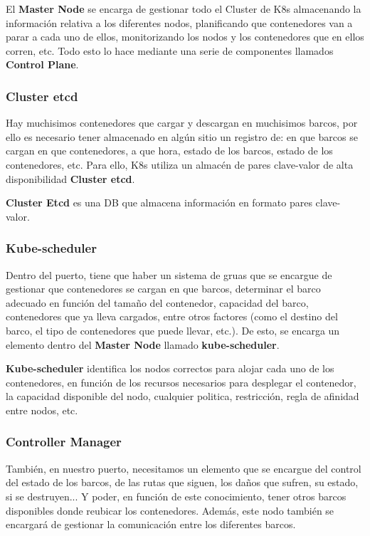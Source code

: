 \documentclass{article}
\begin{document}
El \textbf{Master Node} se encarga de gestionar todo el Cluster de K8s almacenando la información relativa a los diferentes nodos, planificando que contenedores van a parar a cada uno de ellos, monitorizando los nodos y los contenedores que en ellos corren, etc. Todo esto lo hace mediante una serie de componentes llamados \textbf{Control Plane}.

\subsubsection{Cluster etcd}

Hay muchisimos contenedores que cargar y descargan en muchisimos barcos, por ello es necesario tener almacenado en algún sitio un registro de: en que barcos se cargan en que contenedores, a que hora, estado de los barcos, estado de los contenedores, etc. Para ello, K8s utiliza un almacén de pares clave-valor de alta disponibilidad \textbf{Cluster etcd}.

\textbf{Cluster Etcd} es una DB que almacena información en formato pares clave-valor.

\subsubsection{Kube-scheduler}

Dentro del puerto, tiene que haber un sistema de gruas que se encargue de gestionar que contenedores se cargan en que barcos, determinar el barco adecuado en función del tamaño del contenedor, capacidad del barco, contenedores que ya lleva cargados, entre otros factores (como el destino del barco, el tipo de contenedores que puede llevar, etc.). De esto, se encarga un elemento dentro del \textbf{Master Node} llamado \textbf{kube-scheduler}.

\textbf{Kube-scheduler} identifica los nodos correctos para alojar cada uno de los contenedores, en función de los recursos necesarios para desplegar el contenedor, la capacidad disponible del nodo, cualquier politica, restricción, regla de afinidad entre nodos, etc.

\subsubsection{Controller Manager}

También, en nuestro puerto, necesitamos un elemento que se encargue del control del estado de los barcos, de las rutas que siguen, los daños que sufren, su estado, si se destruyen... Y poder, en función de este conocimiento, tener otros barcos disponibles donde reubicar los contenedores. Además, este nodo también se encargará de gestionar la comunicación entre los diferentes barcos. 
\end{document}
